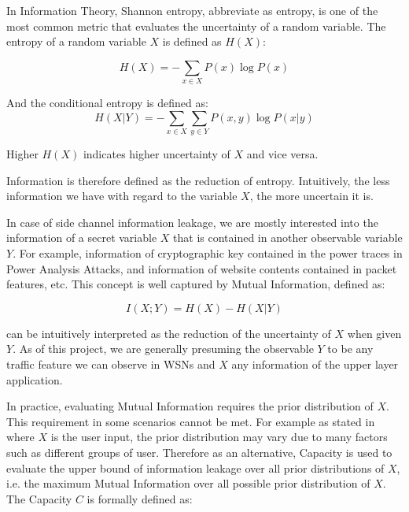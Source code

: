 In Information Theory, Shannon entropy, abbreviate as entropy, is one of the most common metric that evaluates the uncertainty of a random variable. The entropy of a random variable $X$ is defined as $H(X)$:

\begin{equation} \label{Eq: Entropy}
	H(X) = - \sum_{x \in X}{P(x) \log{P(x)}}
\end{equation}

And the conditional entropy is defined as:
\begin{equation} \label{Eq: Conditional Entropy}
H(X|Y) = -\sum_{x \in X}\sum_{y \in Y}P(x,y)\log{P(x|y)}
\end{equation}

Higher $H(X)$ indicates higher uncertainty of $X$ and vice versa.

Information is therefore defined as the reduction of entropy. Intuitively, the less information we have with regard to the variable $X$, the more uncertain it is.

In case of side channel information leakage, we are mostly interested into the information of a secret variable $X$ that is contained in another observable variable $Y$. For example, information of cryptographic key contained in the power traces in Power Analysis Attacks\cite{DPA}, and information of website contents contained in packet features, etc. This concept is well captured by Mutual Information, defined as:

\begin{equation} \label{Eq: MI}
	I(X;Y) = H(X) - H(X | Y)
\end{equation}

 can be intuitively interpreted as the reduction of the uncertainty of $X$ when given $Y$. As of this project, we are generally presuming the observable $Y$ to be any traffic feature we can observe in WSNs and $X$ any information of the upper layer application.

In practice, evaluating Mutual Information requires the prior distribution of $X$. This requirement in some scenarios cannot be met. For example as stated in \cite{PinpointWeb} where $X$ is the user input, the prior distribution may vary due to many factors such as different groups of user. Therefore as an alternative,  Capacity is used to evaluate the upper bound of information leakage over all prior distributions of $X$, i.e. the maximum Mutual Information over all possible prior distribution of $X$. The Capacity $C$ is formally defined as:

